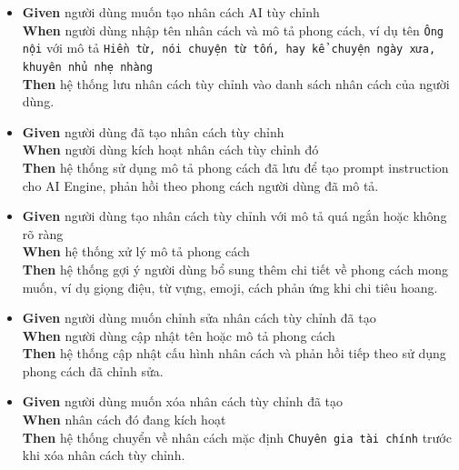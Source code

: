 \begin{itemize}
\item \textbf{Given} người dùng muốn tạo nhân cách AI tùy chỉnh  \\ \hspace*{1.5em}  \textbf{When} người dùng nhập tên nhân cách và mô tả phong cách, ví dụ tên \texttt{Ông nội} với mô tả \texttt{Hiền từ, nói chuyện từ tốn, hay kể chuyện ngày xưa, khuyên nhủ nhẹ nhàng}  \\ \hspace*{1.5em}  \textbf{Then} hệ thống lưu nhân cách tùy chỉnh vào danh sách nhân cách của người dùng.
\item \textbf{Given} người dùng đã tạo nhân cách tùy chỉnh  \\ \hspace*{1.5em}  \textbf{When} người dùng kích hoạt nhân cách tùy chỉnh đó  \\ \hspace*{1.5em}  \textbf{Then} hệ thống sử dụng mô tả phong cách đã lưu để tạo prompt instruction cho AI Engine, phản hồi theo phong cách người dùng đã mô tả.
\item \textbf{Given} người dùng tạo nhân cách tùy chỉnh với mô tả quá ngắn hoặc không rõ ràng  \\ \hspace*{1.5em}  \textbf{When} hệ thống xử lý mô tả phong cách  \\ \hspace*{1.5em}  \textbf{Then} hệ thống gợi ý người dùng bổ sung thêm chi tiết về phong cách mong muốn, ví dụ giọng điệu, từ vựng, emoji, cách phản ứng khi chi tiêu hoang.
\item \textbf{Given} người dùng muốn chỉnh sửa nhân cách tùy chỉnh đã tạo  \\ \hspace*{1.5em}  \textbf{When} người dùng cập nhật tên hoặc mô tả phong cách  \\ \hspace*{1.5em}  \textbf{Then} hệ thống cập nhật cấu hình nhân cách và phản hồi tiếp theo sử dụng phong cách đã chỉnh sửa.
\item \textbf{Given} người dùng muốn xóa nhân cách tùy chỉnh đã tạo  \\ \hspace*{1.5em}  \textbf{When} nhân cách đó đang kích hoạt  \\ \hspace*{1.5em}  \textbf{Then} hệ thống chuyển về nhân cách mặc định \texttt{Chuyên gia tài chính} trước khi xóa nhân cách tùy chỉnh.

\end{itemize}
